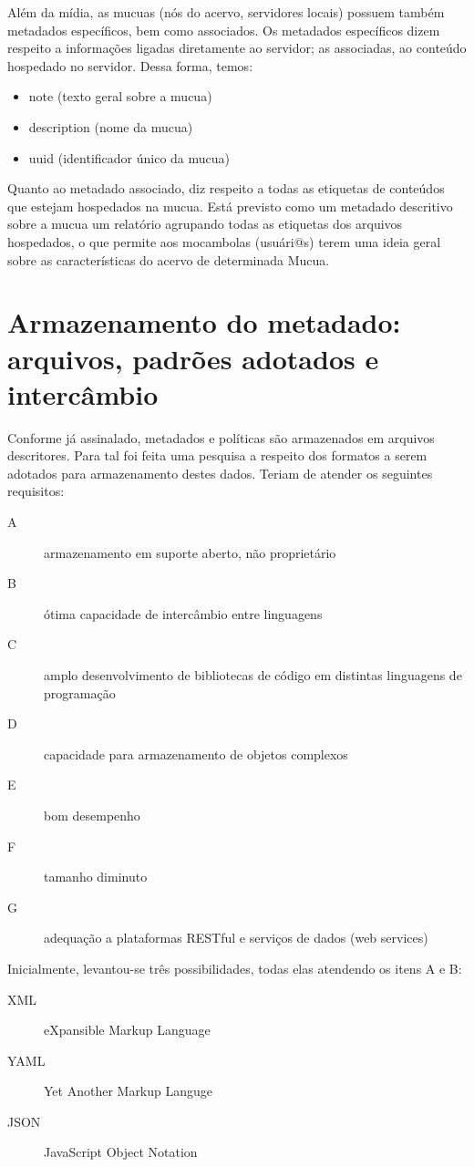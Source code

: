 Além da mídia, as mucuas (nós do acervo, servidores locais) possuem
também metadados específicos, bem como associados. Os metadados
específicos dizem respeito a informações ligadas diretamente ao
servidor; as associadas, ao conteúdo hospedado no servidor. Dessa
forma, temos:
\begin{itemize}
\item note (texto geral sobre a mucua)
\item description (nome da mucua)
\item uuid (identificador único da mucua)
\end{itemize}


Quanto ao metadado associado, diz respeito a todas as etiquetas de
conteúdos que estejam hospedados na mucua. Está previsto como um
metadado descritivo sobre a mucua um relatório agrupando todas as
etiquetas dos arquivos hospedados, o que permite aos mocambolas
(usuári@s) terem uma ideia geral sobre as características do acervo
de determinada Mucua.

\section{Armazenamento do metadado: arquivos, padrões adotados e intercâmbio}
Conforme já assinalado, metadados e políticas são armazenados em
arquivos descritores. Para tal foi feita uma pesquisa a respeito dos
formatos a serem adotados para armazenamento destes dados. Teriam de
atender os seguintes requisitos:
\begin{description}
\item[A] armazenamento em suporte aberto, não proprietário
\item[B] ótima capacidade de intercâmbio entre linguagens
\item[C] amplo desenvolvimento de bibliotecas de código em distintas linguagens de programação
\item[D] capacidade para armazenamento de objetos complexos
\item[E] bom desempenho
\item[F] tamanho diminuto
\item[G] adequação a plataformas RESTful e serviços de dados (web services)
\end{description}

Inicialmente, levantou-se três possibilidades, todas elas atendendo os itens A e B:
\begin{description}
\item[XML] eXpansible Markup Language
\item[YAML] Yet Another Markup Languge
\item[JSON] JavaScript Object Notation
\end{description}

